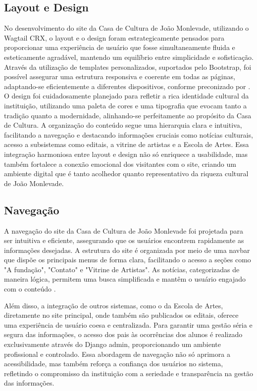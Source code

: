 \subsection{Layout e Design}

No desenvolvimento do site da Casa de Cultura de João Monlevade, utilizando o Wagtail CRX, o layout e o design foram estrategicamente pensados para proporcionar uma experiência de usuário que fosse simultaneamente fluida e esteticamente agradável, mantendo um equilíbrio entre simplicidade e sofisticação. Através da utilização de templates personalizados, suportados pelo Bootstrap, foi possível assegurar uma estrutura responsiva e coerente em todas as páginas, adaptando-se eficientemente a diferentes dispositivos, conforme preconizado por \cite{liddle2013design}. O design foi cuidadosamente planejado para refletir a rica identidade cultural da instituição, utilizando uma paleta de cores e uma tipografia que evocam tanto a tradição quanto a modernidade, alinhando-se perfeitamente ao propósito da Casa de Cultura. A organização do conteúdo segue uma hierarquia clara e intuitiva, facilitando a navegação e destacando informações cruciais como notícias culturais, acesso a subsistemas como editais, a vitrine de artistas e a Escola de Artes. Essa integração harmoniosa entre layout e design não só enriquece a usabilidade, mas também fortalece a conexão emocional dos visitantes com o site, criando um ambiente digital que é tanto acolhedor quanto representativo da riqueza cultural de João Monlevade.

\subsection{Navegação}

A navegação do site da Casa de Cultura de João Monlevade foi projetada para ser intuitiva e eficiente, assegurando que os usuários encontrem rapidamente as informações desejadas. A estrutura do site é organizada por meio de uma navbar que dispõe os principais menus de forma clara, facilitando o acesso a seções como "A fundação", "Contato" e "Vitrine de Artistas". As notícias, categorizadas de maneira lógica, permitem uma busca simplificada e mantêm o usuário engajado com o conteúdo \cite{nielsen2012usability}. 

Além disso, a integração de outros sistemas, como o da Escola de Artes, diretamente no site principal, onde também são publicados os editais, oferece uma experiência de usuário coesa e centralizada. Para garantir uma gestão séria e segura das informações, o acesso dos pais às ocorrências dos alunos é realizado exclusivamente através do Django admin, proporcionando um ambiente profissional e controlado. Essa abordagem de navegação não só aprimora a acessibilidade, mas também reforça a confiança dos usuários no sistema, refletindo o compromisso da instituição com a seriedade e transparência na gestão das informações.

